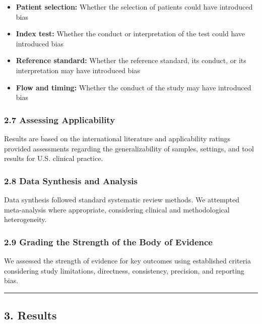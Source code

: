 \documentclass[
  12pt,
  letterpaper,
]{article}
\providecommand{\tightlist}{%
  \setlength{\itemsep}{0pt}\setlength{\parskip}{0pt}}
\renewcommand{\[}{\begin{singlespace}\oldDisplayMath}
\renewcommand{\]}{\endoldDisplayMath\end{singlespace}\vspace{\baselineskip}}
\begin{document}
\begin{itemize}
\tightlist
\item
  \textbf{Patient selection:} Whether the selection of patients could
  have introduced bias
\item
  \textbf{Index test:} Whether the conduct or interpretation of the test
  could have introduced bias
\item
  \textbf{Reference standard:} Whether the reference standard, its
  conduct, or its interpretation may have introduced bias
\item
  \textbf{Flow and timing:} Whether the conduct of the study may have
  introduced bias
\end{itemize}

\subsubsection{2.7 Assessing
Applicability}\label{assessing-applicability}

Results are based on the international literature and applicability
ratings provided assessments regarding the generalizability of samples,
settings, and tool results for U.S. clinical practice.

\subsubsection{2.8 Data Synthesis and
Analysis}\label{data-synthesis-and-analysis}

Data synthesis followed standard systematic review methods. We attempted
meta-analysis where appropriate, considering clinical and methodological
heterogeneity.

\subsubsection{2.9 Grading the Strength of the Body of
Evidence}\label{grading-the-strength-of-the-body-of-evidence}

We assessed the strength of evidence for key outcomes using established
criteria considering study limitations, directness, consistency,
precision, and reporting bias.

\begin{center}\rule{0.5\linewidth}{0.5pt}\end{center}

\subsection{3. Results}\label{results}
\end{document}
